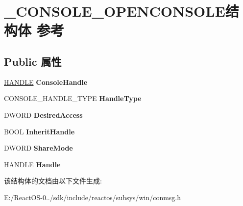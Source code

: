 \hypertarget{struct___c_o_n_s_o_l_e___o_p_e_n_c_o_n_s_o_l_e}{}\section{\+\_\+\+C\+O\+N\+S\+O\+L\+E\+\_\+\+O\+P\+E\+N\+C\+O\+N\+S\+O\+L\+E结构体 参考}
\label{struct___c_o_n_s_o_l_e___o_p_e_n_c_o_n_s_o_l_e}
\subsection*{Public 属性}
\begin{DoxyCompactItemize}
\item 
\mbox{\label{struct___c_o_n_s_o_l_e___o_p_e_n_c_o_n_s_o_l_e_a5056236db4cca448842fdfd83274f241}} 
\hyperlink{interfacevoid}{H\+A\+N\+D\+LE} {\bfseries Console\+Handle}
\item 
\mbox{\label{struct___c_o_n_s_o_l_e___o_p_e_n_c_o_n_s_o_l_e_a3c6e3dc619b47bd6d2069d94ac05ab86}} 
C\+O\+N\+S\+O\+L\+E\+\_\+\+H\+A\+N\+D\+L\+E\+\_\+\+T\+Y\+PE {\bfseries Handle\+Type}
\item 
\mbox{\label{struct___c_o_n_s_o_l_e___o_p_e_n_c_o_n_s_o_l_e_afbf4008d957a7e02609d5020ddd1ad66}} 
D\+W\+O\+RD {\bfseries Desired\+Access}
\item 
\mbox{\label{struct___c_o_n_s_o_l_e___o_p_e_n_c_o_n_s_o_l_e_af37c214f4ba5c73b77957c6f1d84a582}} 
B\+O\+OL {\bfseries Inherit\+Handle}
\item 
\mbox{\label{struct___c_o_n_s_o_l_e___o_p_e_n_c_o_n_s_o_l_e_a56f43ebbd1adf014c45e9c9256913b94}} 
D\+W\+O\+RD {\bfseries Share\+Mode}
\item 
\mbox{\label{struct___c_o_n_s_o_l_e___o_p_e_n_c_o_n_s_o_l_e_a8a96c4ad8e391ada2827ffcb30090914}} 
\hyperlink{interfacevoid}{H\+A\+N\+D\+LE} {\bfseries Handle}
\end{DoxyCompactItemize}


该结构体的文档由以下文件生成\+:\begin{DoxyCompactItemize}
\item 
E\+:/\+React\+O\+S-\/0../sdk/include/reactos/subsys/win/conmsg.\+h\end{DoxyCompactItemize}
